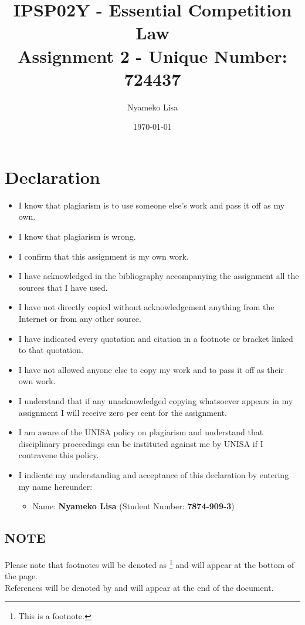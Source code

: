 \documentclass[11pt]{article}
\author{Nyameko Lisa}
\date{\today}
\title{IPSP02Y - Essential Competition Law\\\medskip
\large Assignment 2 - Unique Number: 724437}
\begin{document}
\maketitle
\section*{Declaration}
\label{sec:orgf25f93d}
\begin{itemize}
\item I know that plagiarism is to use someone else’s work and pass it off as my own.
\item I know that plagiarism is wrong.
\item I confirm that this assignment is my own work.
\item I have acknowledged in the bibliography accompanying the assignment all the sources that I have used.
\item I have not directly copied without acknowledgement anything from the Internet or from any other source.
\item I have indicated every quotation and citation in a footnote or bracket linked to that quotation.
\item I have not allowed anyone else to copy my work and to pass it off as their own work.
\item I understand that if any unacknowledged copying whatsoever appears in my assignment I will receive zero per cent for the assignment.
\item I am aware of the UNISA policy on plagiarism and understand that disciplinary proceedings can be instituted against me by UNISA if I contravene this policy.
\item I indicate my understanding and acceptance of this declaration by
entering my name hereunder:
\begin{itemize}
\item Name: \textbf{Nyameko Lisa} (Student Number: \textbf{7874-909-3})
\end{itemize}
\end{itemize}

\subsection*{NOTE}
\label{sec:orge17f5e0}
Please note that footnotes will be denoted as \footnote{This is a footnote.} and will
appear at the bottom of the page.\\
References will be denoted by \cite{wipo83_paris_conve_protect_ip} and will appear at the end of the document.
\newpage
\end{document}

